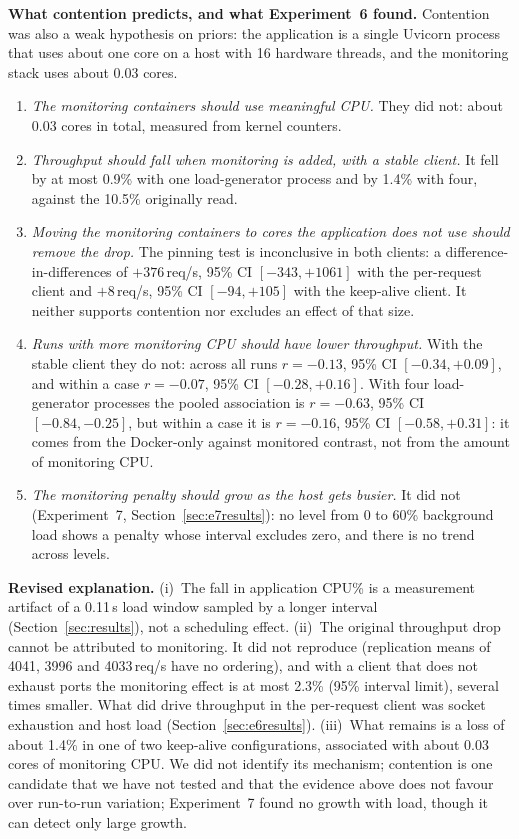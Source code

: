 \documentclass[conference]{IEEEtran}
\begin{document}
\textbf{What contention predicts, and what Experiment~6 found.} Contention was
also a weak hypothesis on priors: the application is a single Uvicorn process that
uses about one core on a host with 16 hardware threads, and the monitoring stack
uses about 0.03 cores.
\begin{enumerate}
\item \emph{The monitoring containers should use meaningful CPU.} They did not:
about 0.03 cores in total, measured from kernel counters.
\item \emph{Throughput should fall when monitoring is added, with a stable
client.} It fell by at most 0.9\% with one load-generator process and by 1.4\%
with four, against the 10.5\% originally read.
\item \emph{Moving the monitoring containers to cores the application does not
use should remove the drop.} The pinning test is inconclusive in both clients:
a difference-in-differences of $+376$\,req/s, 95\% CI $[-343, +1061]$ with the
per-request client and $+8$\,req/s, 95\% CI $[-94, +105]$ with the keep-alive
client. It neither supports contention nor excludes an effect of that size.
\item \emph{Runs with more monitoring CPU should have lower throughput.} With
the stable client they do not: across all runs $r{=}-0.13$, 95\% CI $[-0.34, +0.09]$,
and within a case $r{=}-0.07$, 95\% CI $[-0.28, +0.16]$. With four load-generator
processes the pooled association is $r{=}-0.63$, 95\% CI $[-0.84, -0.25]$, but within
a case it is $r{=}-0.16$, 95\% CI $[-0.58, +0.31]$: it comes from the Docker-only
against monitored contrast, not from the amount of monitoring CPU.
\item \emph{The monitoring penalty should grow as the host gets busier.} It did not
(Experiment~7, Section~\ref{sec:e7results}): no level from 0 to 60\% background load
shows a penalty whose interval excludes zero, and there is no trend across levels.
\end{enumerate}

\textbf{Revised explanation.}
(i)~The fall in application CPU\% is a measurement artifact of a 0.11\,s load window
sampled by a longer interval (Section~\ref{sec:results}), not a scheduling effect.
(ii)~The original throughput drop cannot be attributed to monitoring. It did not
reproduce (replication means of 4041, 3996 and 4033\,req/s have no ordering), and with
a client that does not exhaust ports the monitoring effect is at most 2.3\% (95\% interval limit), several
times smaller. What did drive throughput in the per-request client was socket exhaustion
and host load (Section~\ref{sec:e6results}). (iii)~What remains is a loss of about 1.4\% in
one of two keep-alive configurations, associated with about 0.03 cores of monitoring CPU.
We did not identify its mechanism; contention is one candidate that we have not tested
and that the evidence above does not favour over run-to-run variation; Experiment~7
found no growth with load, though it can detect only large growth.
\end{document}
